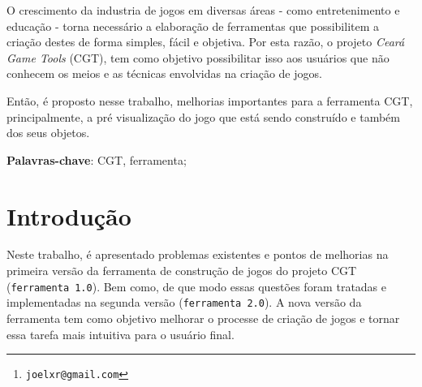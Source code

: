 \documentclass[12pt,twoside,openright,a4paper,english,brazil,sumario=tradicional]{abntex2}
\author{Joel Xavier Rocha\thanks{\texttt{joelxr@gmail.com}}}
\begin{document}
\frenchspacing
\imprimircapa
\imprimirfolhaderosto*

%     

% 

\begin{agradecimentos}

\end{agradecimentos}
\setlength{\absparsep}{18pt}
\begin{resumo}
   O crescimento da industria de jogos em diversas áreas - como entretenimento e educação - torna necessário a elaboração de ferramentas que possibilitem a criação destes de forma simples, fácil e objetiva. Por esta razão, o projeto \emph{Ceará Game Tools} (CGT), tem como objetivo possibilitar isso aos usuários que não conhecem os meios e as técnicas envolvidas na criação de jogos.

   Então, é proposto nesse trabalho, melhorias importantes para a ferramenta CGT, principalmente, a pré visualização do jogo que está sendo construído e também dos seus objetos.

   \vspace{\onelineskip}
   \noindent
   \textbf{Palavras-chave}: CGT, ferramenta;
\end{resumo}
\listoffigures*
\cleardoublepage
{}
\listoftables*
\cleardoublepage
{}
\tableofcontents*
\cleardoublepage
\textual
\chapter{Introdução} %
\label{chap:introducao}
Neste trabalho, é apresentado problemas existentes e pontos de melhorias na primeira versão da ferramenta de construção de jogos do projeto CGT (\texttt{ferramenta 1.0}). Bem como, de que modo essas questões foram tratadas e implementadas na segunda versão (\texttt{ferramenta 2.0}). A nova versão da ferramenta tem como objetivo melhorar o processe de criação de jogos e tornar essa tarefa mais intuitiva para o usuário final.
\end{document}
